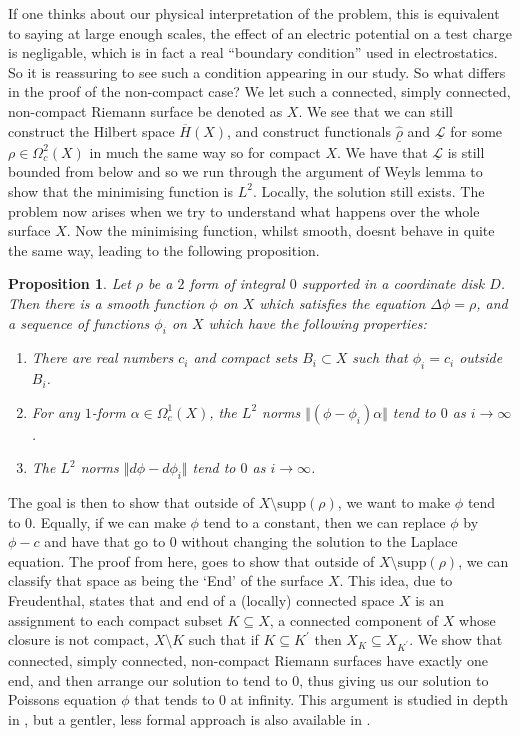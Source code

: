 \documentclass[11pt]{report}
\newtheorem{prop}[thm]{Proposition}
\theoremstyle{definition}
\begin{document}
If one thinks about our physical interpretation of the problem, this is equivalent to saying at large enough scales, the effect of an electric potential on a test charge is negligable, which is in fact a real ``boundary condition'' used in electrostatics. So it is reassuring to see such a condition appearing in our study. So what differs in the proof of the non-compact case? We let such a connected, simply connected, non-compact Riemann surface be denoted as $X$. We see that we can still construct the Hilbert space $\overline{H}(X)$, and construct functionals $\underline{\hat{\rho}}$ and $\underline{\mathcal{L}}$ for some $\rho \in \Omega^2_c(X)$ in much the same way so for compact $X$. We have that $\underline{\mathcal{L}}$ is still bounded from below and so we run through the argument of Weyls lemma to show that the minimising function is $L^2$. Locally, the solution still exists. The problem now arises when we try to understand what happens over the whole surface $X$. Now the minimising function, whilst smooth, doesnt behave in quite the same way, leading to the following proposition.
\begin{prop}\cite[Proposition 32]{donaldson}
  Let $\rho$ be a $2$ form of integral $0$ supported in a coordinate disk $D$. Then there is a smooth function $\phi$ on $X$ which satisfies the equation $\Delta \phi = \rho$, and a sequence of functions $\phi_i$ on $X$ which have the following properties:
  \begin{enumerate}
    \item There are real numbers $c_i$ and compact sets $B_i\subset X$ such that $\phi_i = c_i$ outside $B_i$.
    \item For any $1$-form $\alpha \in \Omega^1_c(X)$, the $L^2$ norms $\Vert(\phi - \phi_i)\alpha\Vert$ tend to $0$ as $i \rightarrow \infty$.
    \item The $L^2$ norms $\Vert d\phi -d\phi_i\Vert$ tend to $0$ as $i \rightarrow \infty$.
  \end{enumerate}
\end{prop}
The goal is then to show that outside of $X\setminus\text{supp}(\rho)$, we want to make $\phi$ tend to $0$. Equally, if we can make $\phi$ tend to a constant, then we can replace $\phi$ by $\phi - c$ and have that go to $0$ without changing the solution to the Laplace equation. The proof from here, goes to show that outside of $X\setminus\text{supp}(\rho)$, we can classify that space as being the `End' of the surface $X$. This idea, due to Freudenthal, states that and end of a (locally) connected space $X$ is an assignment to each compact subset $K \subseteq X$, a connected component of $X$ whose closure is not compact, $X\setminus K$ such that if $K\subseteq K^{\prime}$ then $X_K \subseteq X_{K^{\prime}}$. We show that connected, simply connected, non-compact Riemann surfaces have exactly one end, and then arrange our solution to tend to $0$, thus giving us our solution to Poissons equation $\phi$ that tends to $0$ at infinity. This argument is studied in depth in \cite[Chapter 10]{donaldson}, but a gentler, less formal approach is also available in \cite[p.32]{notes}.
\end{document}
